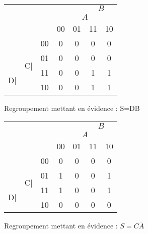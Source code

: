 \documentclass[a4paper,11pt]{book}
\theoremstyle{definition}
\theoremstyle{definition}
\begin{document}
\begin{figure}
  \centering
  \begin{tabular}{|ccc|c|c|c|c|}
    \hline
         & & & \multicolumn{2}{c}{} & \multicolumn{2}{c|}{\underline{$\:\:\:B\:\:\:$}} \\
         & & & \multicolumn{1}{c}{}& \multicolumn{2}{c}{\underline{$\:\:\:A\:\:\:$}} & \\
         & & &  00 & 01 & 11 & 10 \\
    \hline 
         & & 00 & 0 & 0 & 0 & 0\\
    \cline{3-7}
         & \multirow{2}{1em}{C|} & 01 & 0 & 0 & 0 & 0\\
    \cline{3-7}
         \multirow{2}{1em}{D|} & & 11 & 0 & 0 & \cellcolor{blue!25}1 & \cellcolor{blue!25}1\\
    \cline{3-7}
         & & 10 & 0 & 0 & \cellcolor{blue!25}1 & \cellcolor{blue!25}1\\
    \hline
  \end{tabular}
  \caption{Regroupement mettant en évidence : S=DB}
  \label{tab:karnaughEx3}
\end{figure}

\begin{figure}
  \centering
  \begin{tabular}{|ccc|c|c|c|c|}
    \hline
         & & & \multicolumn{2}{c}{} & \multicolumn{2}{c|}{\underline{$\:\:\:B\:\:\:$}} \\
         & & & \multicolumn{1}{c}{}& \multicolumn{2}{c}{\underline{$\:\:\:A\:\:\:$}} & \\
         & & &  00 & 01 & 11 & 10 \\
    \hline 
         & & 00 & 0 & 0 & 0 & 0\\
    \cline{3-7}
         & \multirow{2}{1em}{C|} & 01 & \cellcolor{blue!25}1 & 0 & 0 & \cellcolor{blue!25}1\\
    \cline{3-7}
         \multirow{2}{1em}{D|} & & 11 & \cellcolor{blue!25}1 & 0 & 0 & \cellcolor{blue!25}1\\
    \cline{3-7}
         & & 10 & 0 & 0 & 0 & 0\\
    \hline
  \end{tabular}
  \caption{Regroupement mettant en évidence : $S=C\overline{A}$}
  \label{tab:karnaughEx4}
\end{figure}
\end{document}
